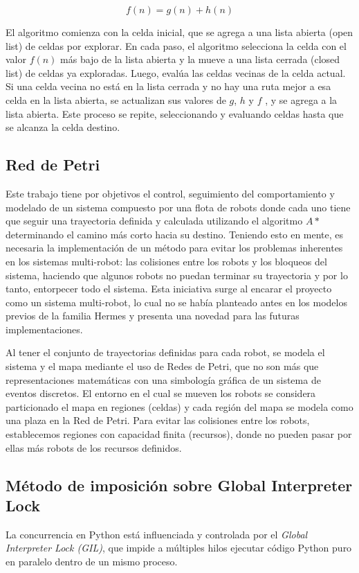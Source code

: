 \begin{equation}
    f(n) = g(n) + h(n)    
    \label{ec:distancia}
\end{equation}

El algoritmo comienza con la celda inicial, que se agrega a una lista abierta (open list) de celdas por explorar. En cada paso, el algoritmo selecciona la celda con el valor $f(n)$ más bajo de la lista abierta y la mueve a una lista cerrada (closed list) de celdas ya exploradas. Luego, evalúa las celdas vecinas de la celda actual. Si una celda vecina no está en la lista cerrada y no hay una ruta mejor a esa celda en la lista abierta, se actualizan sus valores de $g$, $h$ y $f$ , y se agrega a la lista abierta. Este proceso se repite, seleccionando y evaluando celdas hasta que se alcanza la celda destino.

\subsection{Red de Petri}
Este trabajo tiene por objetivos el control, seguimiento del comportamiento y modelado de un sistema compuesto por una flota de robots donde cada uno tiene que seguir una trayectoria definida y calculada utilizando el algoritmo $A*$ determinando el camino más corto hacia su destino. Teniendo esto en mente, es necesaria la implementación de un método para evitar los problemas inherentes en los sistemas multi-robot: las colisiones entre los robots y los bloqueos del sistema, haciendo que algunos robots no puedan terminar su trayectoria y por lo tanto, entorpecer todo el sistema. Esta iniciativa surge al encarar el proyecto como un sistema multi-robot, lo cual no se había planteado antes en los modelos previos de la familia Hermes y presenta una novedad para las futuras implementaciones.

Al tener el conjunto de trayectorias definidas para cada robot, se modela el sistema y el mapa mediante el uso de Redes de Petri, que no son más que representaciones matemáticas con una simbología gráfica de un sistema de eventos discretos. El entorno en el cual se mueven los robots se considera particionado el mapa en regiones (celdas) y cada región del mapa se modela como una plaza en la Red de Petri. Para evitar las colisiones entre los robots, establecemos regiones con capacidad finita (recursos), donde no pueden pasar por ellas más robots de los recursos definidos. \cite{mahulea2020multi}

\subsection{Método de imposición sobre Global Interpreter Lock}
La concurrencia en Python está influenciada y controlada por el \textit{Global Interpreter Lock (GIL)}, que impide a múltiples hilos ejecutar código Python puro en paralelo dentro de un mismo proceso.

